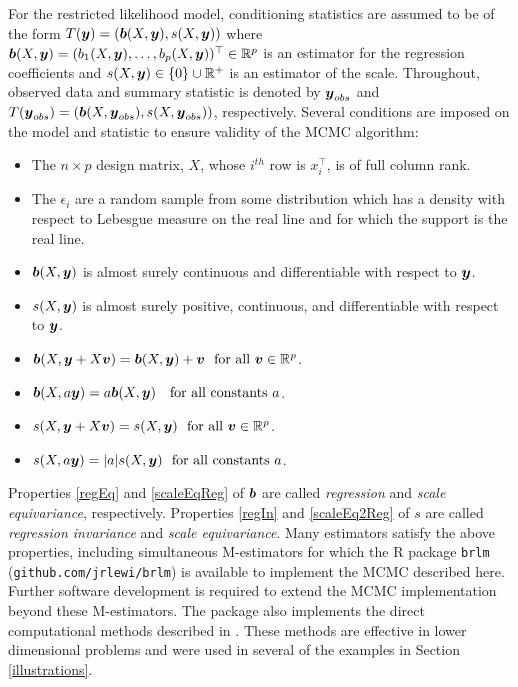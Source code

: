 \documentclass[12pt]{article}
\makeatletter
\newcommand{\by}{\mbox{\boldmath $y$}}
\newcommand{\bv}{\mbox{\boldmath $v$}}
\newcommand{\bb}{\mbox{\boldmath $b$}}
\newcommand{\green}[1]{{\color{green}#1}}
\newcommand{\labitem}[2]{%
\def\@itemlabel{\textbf{#1}{.}}
\item
\def\@currentlabel{#1}\label{#2}}
\makeatother
\begin{document}
For the restricted likelihood model,  conditioning statistics are assumed to be of the form $T(\by) = (\bb(X, \by), s(X, \by))$ where $\bb(X, \by)= (b_1(X,\by), \dots,b_p(X,\by))^\top\in \mathbb R^{p}$ is an estimator for the regression coefficients and $s(X, \by)\in \{0\} \cup {\mathbb R}^+$ is an estimator of the scale. Throughout, observed data and summary statistic is denoted by $\by_{obs}$ and $T(\by_{obs})=(\bb(X, \by_{obs}), s(X, \by_{obs}))$, respectively. 
Several conditions are imposed on the model and statistic to ensure validity of the MCMC algorithm:
\begin{itemize}
\labitem{C1}{fullRank} The $n \times p$ design matrix, $X$, whose $i^{th}$ row is $x_i^\top$, 
is of full column rank.  
\labitem{C2}{supReal} The $\epsilon_i$ are a random sample from some distribution which has a density with 
respect to Lebesgue measure on the real line and for which the support is the real line.  
\labitem{C3}{asb}$\bb(X,\by)$ is almost surely continuous and differentiable with respect to $\by$.  
\labitem{C4}{as} $s(X,\by)$ is almost surely positive, continuous, and differentiable with respect to $\by$.  
\labitem{C5}{regEq} $\bb(X,\by+X\bv)=\bb(X,\by)+\bv \ \ \text{for  all}\ \bv\in\mathbb{R}^p$. 
\labitem{C6}{scaleEqReg} $\bb(X,a\by)=a\bb(X,\by)\ \ \ \text{for all constants } a$.  
\labitem{C7}{regIn} $s(X,\by+X\bv)=s(X,\by) \ \ \text{for all}\ \bv\in\mathbb{R}^p$.  
\labitem{C8}{scaleEq2Reg} $s(X, a\by)=|a|s(X,\by) \ \ \text{for all constants } a$.  
\end{itemize}
Properties \ref{regEq} and \ref{scaleEqReg} of $\bb$ are called
\textit{regression} and \textit{scale equivariance},
respectively.  Properties \ref{regIn} and \ref{scaleEq2Reg} of $s$ are called \textit{regression invariance}
and \textit{scale equivariance}. 
Many estimators satisfy the above properties, including simultaneous M-estimators \citep{huber2009, maronna2006} for which the R package \texttt{brlm} (\texttt{github.com/jrlewi/brlm}) is available to implement the MCMC described here. Further software development is required to extend the MCMC implementation beyond these M-estimators. The package also implements the direct computational methods described in \cite{lewis2014}. These methods are effective in lower dimensional problems and were used in several of the examples in Section \ref{illustrations}.
\end{document}
